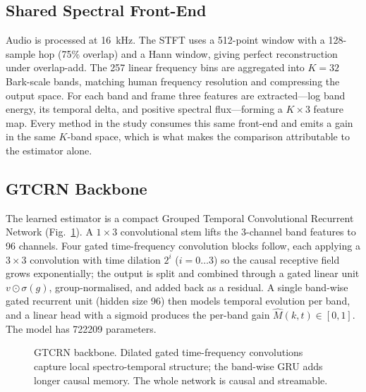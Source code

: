 \documentclass[runningheads]{llncs}
\begin{document}
\subsection{Shared Spectral Front-End}
Audio is processed at \SI{16}{\kilo\hertz}. The STFT uses a
\num{512}-point window with a \num{128}-sample hop (75\% overlap) and a Hann
window, giving perfect reconstruction under overlap-add. The 257 linear
frequency bins are aggregated into $K=32$ Bark-scale bands, matching human
frequency resolution and compressing the output space. For each band and frame
three features are extracted---log band energy, its temporal delta, and
positive spectral flux---forming a $K\times3$ feature map. Every method in the
study consumes this same front-end and emits a gain in the same $K$-band space,
which is what makes the comparison attributable to the estimator alone.

\subsection{GTCRN Backbone}
The learned estimator is a compact Grouped Temporal Convolutional Recurrent
Network (Fig.~\ref{fig:arch}). A $1\times3$ convolutional stem lifts the
3-channel band features to 96 channels. Four gated time-frequency convolution
blocks follow, each applying a $3\times3$ convolution with time dilation
$2^{i}$ ($i=0\ldots3$) so the causal receptive field grows exponentially; the
output is split and combined through a gated linear unit
$v\odot\sigma(g)$, group-normalised, and added back as a residual. A single
band-wise gated recurrent unit (hidden size 96) then models temporal evolution
per band, and a linear head with a sigmoid produces the per-band gain
$\hat{M}(k,t)\in[0,1]$. The model has \num{722209} parameters.

\begin{figure}[t]
\centering
{}
\caption{GTCRN backbone. Dilated gated time-frequency convolutions capture local
spectro-temporal structure; the band-wise GRU adds longer causal memory. The
whole network is causal and streamable.}
\label{fig:arch}
\end{figure}
\end{document}
